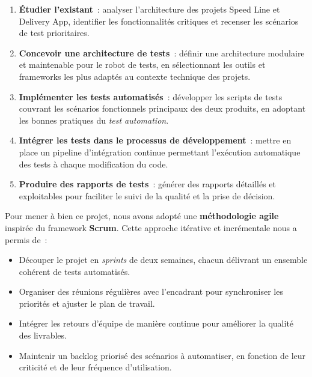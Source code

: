 \begin{enumerate}
  \item \textbf{\'{E}tudier l'existant}~: analyser l'architecture des projets
    Speed Line et Delivery App, identifier les fonctionnalit\'{e}s critiques
    et recenser les sc\'{e}narios de test prioritaires.

  \item \textbf{Concevoir une architecture de tests}~: d\'{e}finir une
    architecture modulaire et maintenable pour le robot de tests, en
    s\'{e}lectionnant les outils et frameworks les plus adapt\'{e}s au contexte
    technique des projets.

  \item \textbf{Impl\'{e}menter les tests automatis\'{e}s}~: d\'{e}velopper les
    scripts de tests couvrant les sc\'{e}narios fonctionnels principaux des
    deux produits, en adoptant les bonnes pratiques du \textit{test
    automation}.

  \item \textbf{Int\'{e}grer les tests dans le processus de d\'{e}veloppement}~:
    mettre en place un pipeline d'int\'{e}gration continue permettant
    l'ex\'{e}cution automatique des tests \`{a} chaque modification du code.

  \item \textbf{Produire des rapports de tests}~: g\'{e}n\'{e}rer des rapports
    d\'{e}taill\'{e}s et exploitables pour faciliter le suivi de la qualit\'{e} et
    la prise de d\'{e}cision.
\end{enumerate}

\vspace{0.3cm}


Pour mener \`{a} bien ce projet, nous avons adopt\'{e} une \textbf{m\'{e}thodologie
agile} inspir\'{e}e du framework \textbf{Scrum}. Cette approche it\'{e}rative et
incr\'{e}mentale nous a permis de~:

\begin{itemize}
  \item D\'{e}couper le projet en \textit{sprints} de deux semaines, chacun
    d\'{e}livrant un ensemble coh\'{e}rent de tests automatis\'{e}s.
  \item Organiser des r\'{e}unions r\'{e}guli\`{e}res avec l'encadrant pour
    synchroniser les priorit\'{e}s et ajuster le plan de travail.
  \item Int\'{e}grer les retours d'\'{e}quipe de mani\`{e}re continue pour
    am\'{e}liorer la qualit\'{e} des livrables.
  \item Maintenir un backlog prioris\'{e} des sc\'{e}narios \`{a} automatiser, en
    fonction de leur criticit\'{e} et de leur fr\'{e}quence d'utilisation.
\end{itemize}

